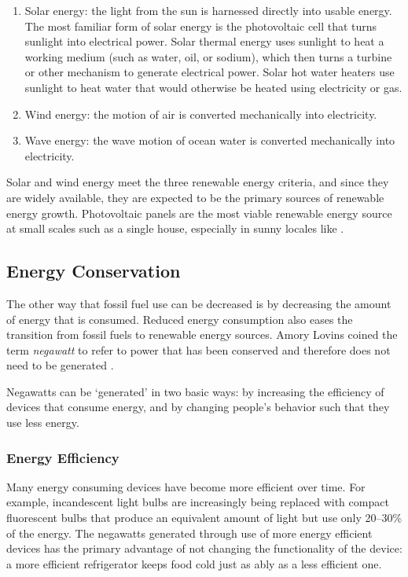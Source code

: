 \begin{enumerate}

\item Solar energy: the light from the sun is harnessed directly into usable energy. The most familiar form of solar energy is the photovoltaic cell that turns sunlight into electrical power. Solar thermal energy uses sunlight to heat a working medium (such as water, oil, or sodium), which then turns a turbine or other mechanism to generate electrical power. Solar hot water heaters use sunlight to heat water that would otherwise be heated using electricity or gas.

\item Wind energy: the motion of air is converted mechanically into electricity.

\item Wave energy: the wave motion of ocean water is converted mechanically into electricity.

\end{enumerate}

Solar and wind energy meet the three renewable energy criteria, and since they are widely available, they are expected to be the primary sources of renewable energy growth. Photovoltaic panels are the most viable renewable energy source at small scales such as a single house, especially in sunny locales like \Hawaii.

\subsection{Energy Conservation}

The other way that fossil fuel use can be decreased is by decreasing the amount of energy that is consumed. Reduced energy consumption also eases the transition from fossil fuels to renewable energy sources. Amory Lovins coined the term \emph{negawatt} to refer to power that has been conserved and therefore does not need to be generated \cite{Kolbert2007Mr-Green}.

Negawatts can be `generated' in two basic ways: by increasing the efficiency of devices that consume energy, and by changing people's behavior such that they use less energy.

\subsubsection{Energy Efficiency}

Many energy consuming devices have become more efficient over time. For example, incandescent light bulbs are increasingly being replaced with compact fluorescent bulbs that produce an equivalent amount of light but use only 20--30\% of the energy. The negawatts generated through use of more energy efficient devices has the primary advantage of not changing the functionality of the device: a more efficient refrigerator keeps food cold just as ably as a less efficient one.

